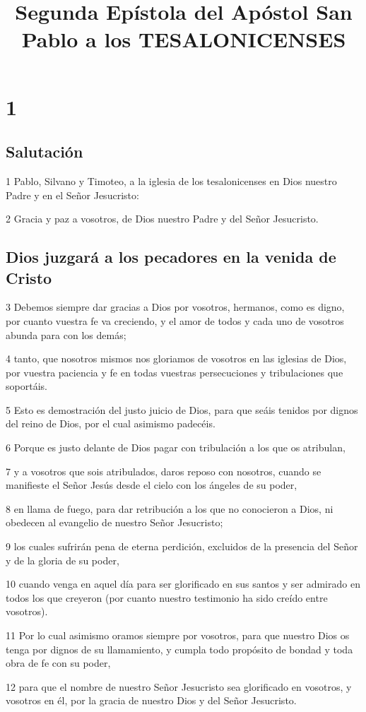 
\title{Segunda Epístola del Apóstol San Pablo a los TESALONICENSES}

\chapter{1}

\section*{Salutación}

\par 1 Pablo, Silvano y Timoteo, a la iglesia de los tesalonicenses en Dios nuestro Padre y en el Señor Jesucristo:
\par 2 Gracia y paz a vosotros, de Dios nuestro Padre y del Señor Jesucristo.

\section*{Dios juzgará a los pecadores en la venida de Cristo}

\par 3 Debemos siempre dar gracias a Dios por vosotros, hermanos, como es digno, por cuanto vuestra fe va creciendo, y el amor de todos y cada uno de vosotros abunda para con los demás;
\par 4 tanto, que nosotros mismos nos gloriamos de vosotros en las iglesias de Dios, por vuestra paciencia y fe en todas vuestras persecuciones y tribulaciones que soportáis.
\par 5 Esto es demostración del justo juicio de Dios, para que seáis tenidos por dignos del reino de Dios, por el cual asimismo padecéis.
\par 6 Porque es justo delante de Dios pagar con tribulación a los que os atribulan,
\par 7 y a vosotros que sois atribulados, daros reposo con nosotros, cuando se manifieste el Señor Jesús desde el cielo con los ángeles de su poder,
\par 8 en llama de fuego, para dar retribución a los que no conocieron a Dios, ni obedecen al evangelio de nuestro Señor Jesucristo;
\par 9 los cuales sufrirán pena de eterna perdición, excluidos de la presencia del Señor y de la gloria de su poder,
\par 10 cuando venga en aquel día para ser glorificado en sus santos y ser admirado en todos los que creyeron (por cuanto nuestro testimonio ha sido creído entre vosotros).
\par 11 Por lo cual asimismo oramos siempre por vosotros, para que nuestro Dios os tenga por dignos de su llamamiento, y cumpla todo propósito de bondad y toda obra de fe con su poder,
\par 12 para que el nombre de nuestro Señor Jesucristo sea glorificado en vosotros, y vosotros en él, por la gracia de nuestro Dios y del Señor Jesucristo.

